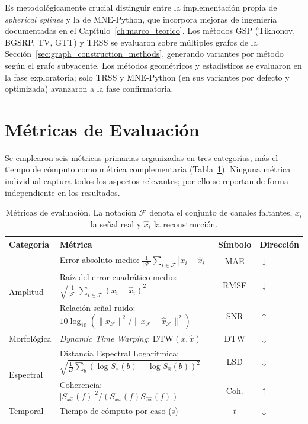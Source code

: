 Es metodológicamente crucial distinguir entre la implementación propia de \textit{spherical splines} y la de MNE-Python, que incorpora mejoras de ingeniería documentadas en el Capítulo~\ref{ch:marco_teorico}. Los métodos GSP (Tikhonov, BGSRP, TV, GTT) y TRSS se evaluaron sobre múltiples grafos de la Sección~\ref{sec:graph_construction_methods}, generando variantes por método según el grafo subyacente. Los métodos geométricos y estadísticos se evaluaron en la fase exploratoria; solo TRSS y MNE-Python (en sus variantes por defecto y optimizada) avanzaron a la fase confirmatoria.

\section{Métricas de Evaluación}
\label{sec:metricas}

Se emplearon seis métricas primarias organizadas en tres categorías, más el tiempo de cómputo como métrica complementaria (Tabla~\ref{tab:metrics}). Ninguna métrica individual captura todos los aspectos relevantes; por ello se reportan de forma independiente en los resultados.

\begin{table}[htbp]
\centering
\caption{Métricas de evaluación. La notación $\mathcal{F}$ denota el conjunto de canales faltantes, $x_i$ la señal real y $\hat{x}_i$ la reconstrucción.}
\label{tab:metrics}
\small
\begin{tabular}{@{}llcl@{}}
\toprule
Categoría & Métrica & Símbolo & Dirección \\
\midrule
\multirow{3}{*}{Amplitud} 
& Error absoluto medio: $\frac{1}{|\mathcal{F}|}\sum_{i\in\mathcal{F}}|x_i-\hat{x}_i|$ 
& MAE & $\downarrow$ \\
& Raíz del error cuadrático medio: $\sqrt{\frac{1}{|\mathcal{F}|}\sum_{i\in\mathcal{F}}(x_i-\hat{x}_i)^2}$ 
& RMSE & $\downarrow$ \\
& Relación señal-ruido: $10\log_{10}(\|x_{\mathcal{F}}\|^2/\|x_{\mathcal{F}}-\hat{x}_{\mathcal{F}}\|^2)$ 
& SNR & $\uparrow$ \\
\midrule
Morfológica 
& \textit{Dynamic Time Warping}: $\mathrm{DTW}(x,\hat{x})$ 
& DTW & $\downarrow$ \\
\midrule
\multirow{2}{*}{Espectral} 
& Distancia Espectral Logarítmica: $\sqrt{\frac{1}{B}\sum_b (\log S_x(b)-\log S_{\hat{x}}(b))^2}$ 
& LSD & $\downarrow$ \\
& Coherencia: $|S_{x\hat{x}}(f)|^2/(S_{xx}(f)S_{\hat{x}\hat{x}}(f))$ 
& Coh. & $\uparrow$ \\
\midrule
Temporal & Tiempo de cómputo por caso (s) & $t$ & $\downarrow$ \\
\bottomrule
\end{tabular}
\end{table}

